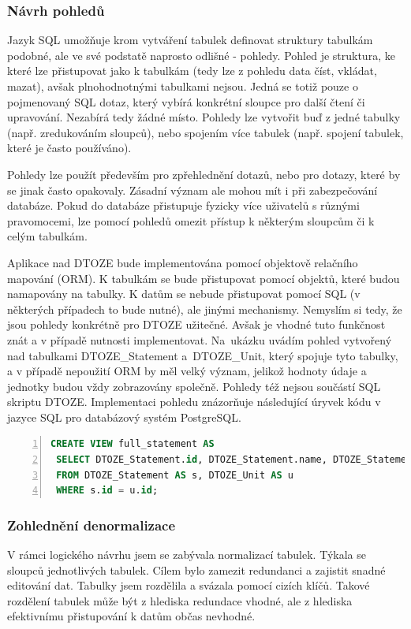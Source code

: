 \documentclass[11pt,a4paper]{article}
\begin{document}
\subsubsection{Návrh pohledů}
Jazyk SQL umožňuje krom vytváření tabulek definovat struktury tabulkám podobné, ale ve své podstatě naprosto odlišné - pohledy. Pohled je struktura, ke které lze přistupovat jako k tabulkám (tedy lze z pohledu data číst, vkládat, mazat), avšak plnohodnotnými tabulkami nejsou. Jedná se totiž pouze o pojmenovaný SQL dotaz, který vybírá konkrétní sloupce pro další čtení či upravování. Nezabírá tedy žádné místo. Pohledy lze vytvořit buď z jedné tabulky (např. zredukováním sloupců), nebo spojením více tabulek (např. spojení tabulek, které je často používáno).

Pohledy lze použít především pro zpřehlednění dotazů, nebo pro dotazy, které by se jinak často opakovaly. Zásadní význam ale mohou mít i při zabezpečování databáze. Pokud do databáze přistupuje fyzicky více uživatelů s různými pravomocemi, lze pomocí pohledů omezit přístup k některým sloupcům či k celým tabulkám. 

Aplikace nad DTOZE bude implementována pomocí objektově relačního mapování (ORM). K tabulkám se bude přistupovat pomocí objektů, které budou namapovány na tabulky. K datům se nebude přistupovat pomocí SQL (v některých případech to bude nutné), ale jinými mechanismy. Nemyslím si tedy, že jsou pohledy konkrétně pro DTOZE užitečné. Avšak je vhodné tuto funkčnost znát a v případě nutnosti implementovat. Na~ukázku uvádím pohled vytvořený nad tabulkami DTOZE\_Statement a~DTOZE\_Unit, který spojuje tyto tabulky, a v případě nepoužití ORM by měl velký význam, jelikož hodnoty údaje a jednotky budou vždy zobrazovány společně. Pohledy též nejsou součástí SQL skriptu DTOZE. Implementaci pohledu znázorňuje následující úryvek kódu v jazyce SQL pro databázový systém PostgreSQL.

\vspace{0.5cm}
\begin{lstlisting}[language=SQL, label=DescriptiveLabel, backgroundcolor=\color{grey}, numbers=left, basicstyle=\footnotesize, breaklines=true, breakatwhitespace=true]
CREATE VIEW full_statement AS
 SELECT DTOZE_Statement.id, DTOZE_Statement.name, DTOZE_Statement.visibility, DTOZE_Unit.shortcut
 FROM DTOZE_Statement AS s, DTOZE_Unit AS u
 WHERE s.id = u.id;
\end{lstlisting}
\vspace{0.5cm}

\subsubsection{Zohlednění denormalizace \label{cap:denormalizace}}
V rámci logického návrhu jsem se zabývala normalizací tabulek. Týkala se sloupců jednotlivých tabulek. Cílem bylo zamezit redundanci a zajistit snadné editování dat. Tabulky jsem rozdělila a svázala pomocí cizích klíčů. Takové rozdělení tabulek může být z hlediska redundace vhodné, ale z hlediska efektivnímu přistupování k datům občas nevhodné. 
\end{document}
